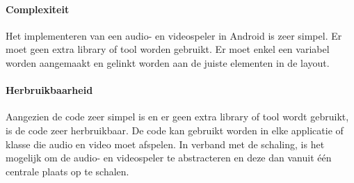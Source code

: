 \paragraph{Complexiteit}
Het implementeren van een audio- en videospeler in Android is zeer simpel. 
Er moet geen extra library of tool worden gebruikt. Er moet enkel een variabel worden aangemaakt
en gelinkt worden aan de juiste elementen in de layout.

\paragraph{Herbruikbaarheid}
Aangezien de code zeer simpel is en er geen extra library of tool wordt gebruikt,
is de code zeer herbruikbaar. De code kan gebruikt worden in elke applicatie of klasse die audio en video
moet afspelen. In verband met de schaling, is het mogelijk om de audio- en videospeler te abstracteren 
en deze dan vanuit één centrale plaats op te schalen. 

